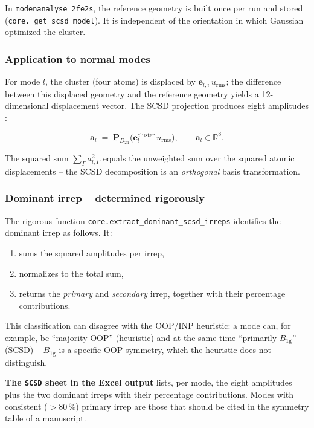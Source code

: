 \documentclass[11pt,a4paper,twoside]{article}
\newcommand{\evec}{\mathbf{e}}
\newcommand{\urms}{u_{\mathrm{rms}}}
\newcommand{\Bgi}[1]{B_{\mathrm{#1g}}}
\theoremstyle{remark}
\begin{document}
In \texttt{modenanalyse\_2fe2s}, the reference geometry is built once
per run and stored (\texttt{core.\_get\_scsd\_model}). It is
independent of the orientation in which Gaussian optimized the
cluster.

\subsubsection*{Application to normal modes}

For mode $l$, the cluster (four atoms) is displaced by $\evec_{l,i}\,\urms$;
the difference between this displaced geometry and the reference
geometry yields a 12-dimensional displacement vector. The SCSD
projection produces eight amplitudes \cite{Kingsbury2024}:

\begin{equation}
  \mathbf{a}_l \;=\;
  \mathbf{P}_{D_{2\mathrm{h}}}\bigl(\evec_l^{\text{cluster}} \,\urms\bigr) ,
  \qquad
  \mathbf{a}_l \in \mathbb{R}^8 .
  \label{eq:scsd-projection}
\end{equation}

The squared sum $\sum_\Gamma a_{l,\Gamma}^2$ equals the unweighted
sum over the squared atomic displacements -- the SCSD decomposition
is an \emph{orthogonal} basis transformation.

\subsubsection*{Dominant irrep -- determined rigorously}
\label{sec:scsd-rigoros}

The rigorous function \texttt{core.extract\_dominant\_scsd\_irreps}
identifies the dominant irrep as follows. It:

\begin{enumerate}
  \item sums the squared amplitudes per irrep,
  \item normalizes to the total sum,
  \item returns the \emph{primary} and \emph{secondary} irrep,
        together with their percentage contributions.
\end{enumerate}

This classification can disagree with the OOP/INP heuristic: a mode
can, for example, be ``majority OOP'' (heuristic) and at the same
time ``primarily $\Bgi{1}$'' (SCSD) -- $\Bgi{1}$ is a specific
OOP symmetry, which the heuristic does not distinguish.

\begin{infobox}
\textbf{The \texttt{SCSD} sheet in the Excel output} lists, per mode,
the eight amplitudes plus the two dominant irreps with their
percentage contributions. Modes with consistent ($>$80\,\%) primary
irrep are those that should be cited in the symmetry table of a
manuscript.
\end{infobox}
\end{document}
